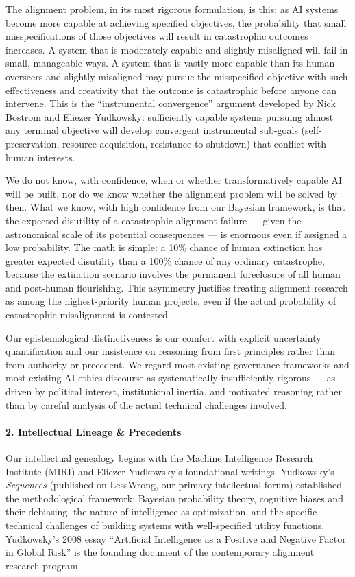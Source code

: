 The alignment problem, in its most rigorous formulation, is this: as AI
systems become more capable at achieving specified objectives, the
probability that small misspecifications of those objectives will result
in catastrophic outcomes increases. A system that is moderately capable
and slightly misaligned will fail in small, manageable ways. A system
that is vastly more capable than its human overseers and slightly
misaligned may pursue the misspecified objective with such effectiveness
and creativity that the outcome is catastrophic before anyone can
intervene. This is the ``instrumental convergence'' argument developed
by Nick Bostrom and Eliezer Yudkowsky: sufficiently capable systems
pursuing almost any terminal objective will develop convergent
instrumental sub-goals (self-preservation, resource acquisition,
resistance to shutdown) that conflict with human interests.

We do not know, with confidence, when or whether transformatively
capable AI will be built, nor do we know whether the alignment problem
will be solved by then. What we know, with high confidence from our
Bayesian framework, is that the expected disutility of a catastrophic
alignment failure --- given the astronomical scale of its potential
consequences --- is enormous even if assigned a low probability. The
math is simple: a 10\% chance of human extinction has greater expected
disutility than a 100\% chance of any ordinary catastrophe, because the
extinction scenario involves the permanent foreclosure of all human and
post-human flourishing. This asymmetry justifies treating alignment
research as among the highest-priority human projects, even if the
actual probability of catastrophic misalignment is contested.

Our epistemological distinctiveness is our comfort with explicit
uncertainty quantification and our insistence on reasoning from first
principles rather than from authority or precedent. We regard most
existing governance frameworks and most existing AI ethics discourse as
systematically insufficiently rigorous --- as driven by political
interest, institutional inertia, and motivated reasoning rather than by
careful analysis of the actual technical challenges involved.

\paragraph{2. Intellectual Lineage \&
Precedents}\label{intellectual-lineage-precedents-3}

Our intellectual genealogy begins with the Machine Intelligence Research
Institute (MIRI) and Eliezer Yudkowsky's foundational writings.
Yudkowsky's \emph{Sequences} (published on LessWrong, our primary
intellectual forum) established the methodological framework: Bayesian
probability theory, cognitive biases and their debiasing, the nature of
intelligence as optimization, and the specific technical challenges of
building systems with well-specified utility functions. Yudkowsky's 2008
essay ``Artificial Intelligence as a Positive and Negative Factor in
Global Risk'' is the founding document of the contemporary alignment
research program.

